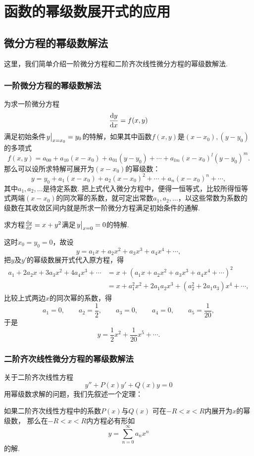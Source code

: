 \section{函数的幂级数展开式的应用}
\subsection{微分方程的幂级数解法}
这里，我们简单介绍一阶微分方程和二阶齐次线性微分方程的幂级数解法.

\subsubsection{一阶微分方程的幂级数解法}
为求一阶微分方程\[
\dv{y}{x} = f(x,y)
\]满足初始条件\(\eval{y}_{x=x_0} = y_0\)的特解，如果其中函数\(f(x,y)\)是\((x-x_0),(y-y_0)\)的多项式\[
f(x,y) = a_{00} + a_{10} (x-x_0) + a_{01} (y-y_0) + \dotsb + a_{lm} (x-x_0)^l (y-y_0)^m.
\]那么可以设所求特解可展开为\((x-x_0)\)的幂级数：\[
y = y_0 + a_1 (x-x_0) + a_2 (x-x_0)^2 + \dotsb + a_n (x-x_0)^n + \dotsb,
\]其中\(a_1,a_2,\dotsc\)是待定系数.
把上式代入微分方程中，便得一恒等式，比较所得恒等式两端\((x-x_0)\)的同次幂的系数，就可定出常数\(a_1,a_2,\dotsc\)，以这些常数为系数的级数在其收敛区间内就是所求一阶微分方程满足初始条件的通解.

\begin{example}
求方程\(\dv{y}{x} = x + y^2\)满足\(\eval{y}_{x=0}=0\)的特解.
\begin{solution}
这时\(x_0=y_0=0\)，故设\[
y = a_1 x + a_2 x^2 + a_3 x^3 + a_4 x^4 + \dotsb,
\]把\(y\)及\(y'\)的幂级数展开式代入原方程，得\begin{align*}
a_1 + 2a_2 x + 3a_3 x^2 + 4a_4 x^3 + \dotsb
&= x + (a_1 x + a_2 x^2 + a_3 x^3 + a_4 x^4 + \dotsb)^2 \\
&= x + a_1^2 x^2 + 2a_1a_2 x^3 + (a_2^2 + 2a_1a_3) x^4 + \dotsb,
\end{align*}
比较上式两边\(x\)的同次幂的系数，得\[
a_1 = 0, \qquad
a_2 = \frac{1}{2}, \qquad
a_3 = 0, \qquad
a_4 = 0, \qquad
a_5 = \frac{1}{20},
\]于是\[
y = \frac{1}{2} x^2 + \frac{1}{20} x^5 + \dotsb.
\]
\end{solution}
\end{example}

\subsubsection{二阶齐次线性微分方程的幂级数解法}
关于二阶齐次线性方程\[
	y'' + P(x) y' + Q(x) y = 0
\]用幂级数求解的问题，我们先叙述一个定理：
\begin{theorem}
如果二阶齐次线性方程中的系数\(P(x)\)与\(Q(x)\)
可在\(-R<x<R\)内展开为\(x\)的幂级数，
那么在\(-R<x<R\)内方程必有形如\[
	y = \sum_{n=0}^\infty a_n x^n
\]的解.
\end{theorem}

